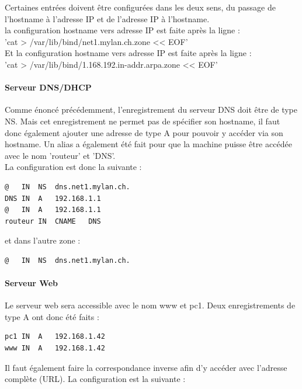 \documentclass{article}
\begin{document}
Certaines entrées doivent être configurées dans les deux sens, du passage de l'hostname à l'adresse IP et de l'adresse IP à l'hostname.\\

la configuration hostname vers adresse IP est faite après la ligne : \\
'cat > /var/lib/bind/net1.mylan.ch.zone << EOF' \\

Et la configuration hostname vers adresse IP est faite après la ligne :\\
 'cat > /var/lib/bind/1.168.192.in-addr.arpa.zone << EOF'

\paragraph{Serveur DNS/DHCP}

Comme énoncé précédemment, l'enregistrement du serveur DNS doit être de type NS. Mais cet enregistrement ne permet pas de spécifier son hostname, il faut donc également ajouter une adresse de type A pour pouvoir y accéder via son hostname. Un alias a également été fait pour que la machine puisse être accédée avec le nom 'routeur' et 'DNS'.\\

La configuration est donc la suivante : 

\begin{lstlisting}
@	IN	NS	dns.net1.mylan.ch.
DNS	IN	A	192.168.1.1
@	IN	A	192.168.1.1
routeur	IN	CNAME	DNS
\end{lstlisting}

et dans l'autre zone :

\begin{lstlisting}
@	IN 	NS	dns.net1.mylan.ch.
\end{lstlisting}

\paragraph{Serveur Web}

Le serveur web sera accessible avec le nom www et pc1. Deux enregistrements de type A ont donc été faits : \\

\begin{lstlisting}
pc1	IN	A	192.168.1.42
www	IN	A	192.168.1.42
\end{lstlisting}

Il faut également faire la correspondance inverse afin d'y accéder avec l'adresse complète (URL). La configuration est la suivante : 
\end{document}
